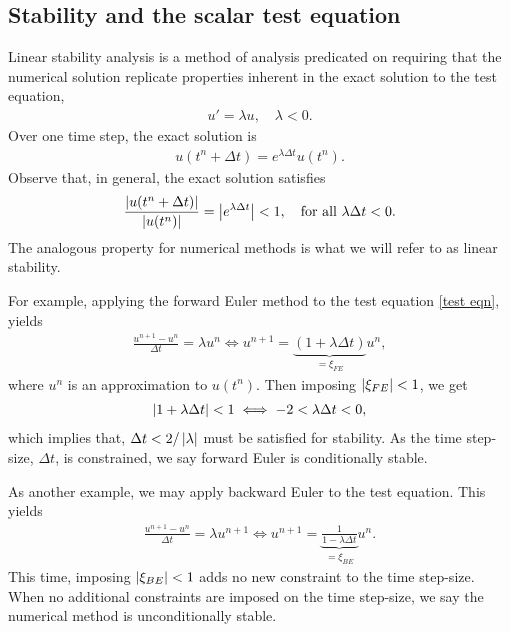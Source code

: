 \subsection{Stability and the scalar test equation}
Linear stability analysis is a method of analysis predicated on requiring that the numerical solution replicate properties inherent in the exact solution to the test equation,
\begin{align}
u' = \lambda u, 
\quad \lambda < 0.
\label{test eqn}
\end{align}  
Over one time step, the exact solution is 
\begin{align}
u(t^n + \Delta t) = e^{\lambda \Delta t} u(t^n).
\end{align}
Observe that, in general, the exact solution satisfies
\begin{align}
\frac{\left|u(t^n + \Delta t)\right|}{\left|u(t^n)\right|}
= \left|e^{\lambda\Delta t} \right| 
< 1,
\quad\text{for all } \lambda\Delta t < 0.
\end{align}
The analogous property for numerical methods is what we will refer to as linear stability.

For example, applying the forward Euler method to the test equation \cref{test eqn}, yields
\begin{align}
\frac{u^{n+1} - u^n}{\Delta t} = \lambda u^n 
\iff u^{n+1} = \underbrace{(1 + \lambda \Delta t)}_{=\xi_{FE}} u^n, 
\end{align}
where $u^n$ is an approximation to $u(t^n)$. Then imposing $\left|\xi_{FE}\right| < 1$, we get 
\begin{align}
\left|1+ \lambda\Delta t\right| < 1 
\iff -2 < \lambda\Delta t < 0,
\end{align}
which implies that, $\Delta t < 2/\left|\lambda\right|$ must be satisfied for stability. As the time step-size, $\Delta t$, is constrained, we say forward Euler is conditionally stable. 

As another example, we may apply backward Euler to the test equation. This yields
\begin{align}
\frac{u^{n+1} - u^n}{\Delta t} = \lambda u^{n+1} 
\iff 
u^{n+1} = \underbrace{\frac{1}{1 - \lambda\Delta t}}_{=\xi_{BE}} u^n.
\end{align}
This time, imposing $\left|\xi_{BE}\right|<1$ adds no new constraint to the time step-size. When no additional constraints are imposed on the time step-size, we say the numerical method is unconditionally stable.


